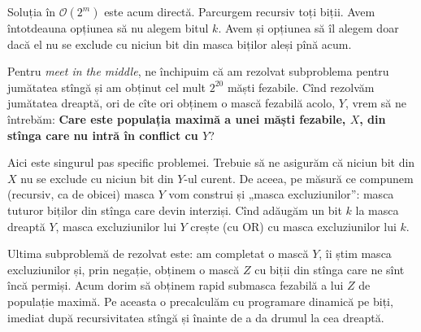 \documentclass[../main.tex]{subfiles}
\begin{document}
Soluția în $\mathcal{O}(2^m)$ este acum directă. Parcurgem recursiv toți biții. Avem întotdeauna opțiunea să nu alegem bitul $k$. Avem și opțiunea să îl alegem doar dacă el nu se exclude cu niciun bit din masca biților aleși pînă acum.

Pentru \textit{meet in the middle}, ne închipuim că am rezolvat subproblema pentru jumătatea stîngă și am obținut cel mult $2^{20}$ măști fezabile. Cînd rezolvăm jumătatea dreaptă, ori de cîte ori obținem o mască fezabilă acolo, $Y$, vrem să ne întrebăm: \textbf{Care este populația maximă a unei măști fezabile, $X$, din stînga care nu intră în conflict cu $Y$}?

Aici este singurul pas specific problemei. Trebuie să ne asigurăm că niciun bit din $X$ nu se exclude cu niciun bit din $Y$-ul curent. De aceea, pe măsură ce compunem (recursiv, ca de obicei) masca $Y$ vom construi și „masca excluziunilor”: masca tuturor biților din stînga care devin interziși. Cînd adăugăm un bit $k$ la masca dreaptă $Y$, masca excluziunilor lui $Y$ crește (cu OR) cu masca excluziunilor lui $k$.

Ultima subproblemă de rezolvat este: am completat o mască $Y$, îi știm masca excluziunilor și, prin negație, obținem o mască $Z$ cu biții din stînga care ne sînt încă permiși. Acum dorim să obținem rapid submasca fezabilă a lui $Z$ de populație maximă. Pe aceasta o precalculăm cu programare dinamică pe biți, imediat după recursivitatea stîngă și înainte de a da drumul la cea dreaptă.
\end{document}

